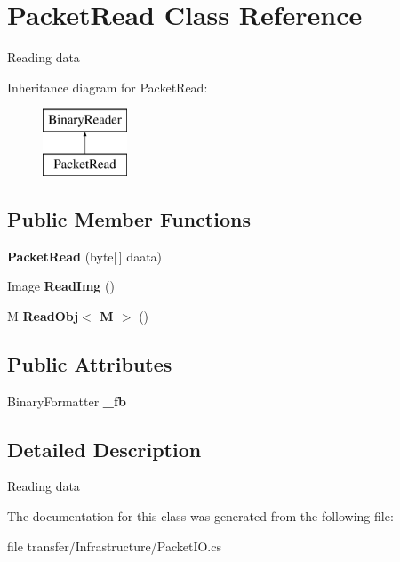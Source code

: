 \hypertarget{class_packet_read}{}\section{Packet\+Read Class Reference}
\label{class_packet_read}


Reading data  


Inheritance diagram for Packet\+Read\+:\begin{figure}[H]
\begin{center}
\leavevmode
\includegraphics[height=2.000000cm]{class_packet_read}
\end{center}
\end{figure}
\subsection*{Public Member Functions}
\begin{DoxyCompactItemize}
\item 
\mbox{\label{class_packet_read_ab9289636db7f2d76a3b06bc829cfcef4}} 
{\bfseries Packet\+Read} (byte\mbox{[}$\,$\mbox{]} daata)
\item 
\mbox{\label{class_packet_read_a3fa00c685b0fb2caaae0a2bcd6ec3d13}} 
Image {\bfseries Read\+Img} ()
\item 
\mbox{\label{class_packet_read_a16fb4b36b1b96d394c57a8bc575a64bd}} 
M {\bfseries Read\+Obj$<$ M $>$} ()
\end{DoxyCompactItemize}
\subsection*{Public Attributes}
\begin{DoxyCompactItemize}
\item 
\mbox{\label{class_packet_read_a95af9fd0f77cdf5feceaabcc5455b794}} 
Binary\+Formatter {\bfseries \+\_\+fb}
\end{DoxyCompactItemize}


\subsection{Detailed Description}
Reading data 



The documentation for this class was generated from the following file\+:\begin{DoxyCompactItemize}
\item 
file transfer/\+Infrastructure/Packet\+I\+O.\+cs\end{DoxyCompactItemize}
